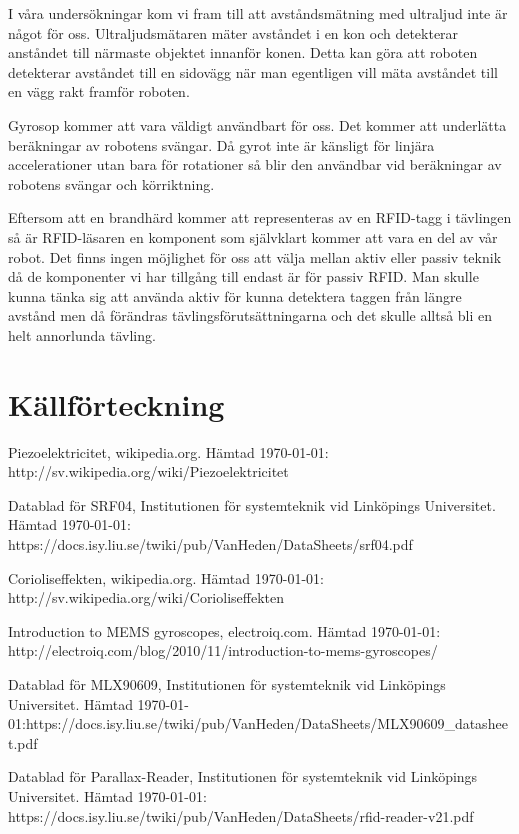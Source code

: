 \documentclass[a4paper,12pt,fleqn]{article}
\begin{document}
I våra undersökningar kom vi fram till att avståndsmätning med ultraljud inte är något för oss. Ultraljudsmätaren mäter avståndet i en kon och detekterar anståndet till närmaste objektet innanför konen. Detta kan göra att roboten detekterar avståndet till en sidovägg när man egentligen vill mäta avståndet till en vägg rakt framför roboten.

Gyrosop kommer att vara väldigt användbart för oss. Det kommer att underlätta beräkningar av robotens svängar. Då gyrot inte är känsligt för linjära accelerationer utan bara för rotationer så blir den användbar vid beräkningar av robotens svängar och körriktning.

Eftersom att en brandhärd kommer att representeras av en RFID-tagg i tävlingen så är RFID-läsaren en komponent som självklart kommer att vara en del av vår robot. Det finns ingen möjlighet för oss att välja mellan aktiv eller passiv teknik då de komponenter vi har tillgång till endast är för passiv RFID. Man skulle kunna tänka sig att använda aktiv för kunna detektera taggen från längre avstånd men då förändras tävlingsförutsättningarna och det skulle alltså bli en helt annorlunda tävling.


\section{Källförteckning}

Piezoelektricitet, wikipedia.org. Hämtad \today:\newline
http://sv.wikipedia.org/wiki/Piezoelektricitet

Datablad för SRF04, Institutionen för systemteknik vid Linköpings Universitet. Hämtad \today:\newline
https://docs.isy.liu.se/twiki/pub/VanHeden/DataSheets/srf04.pdf

Corioliseffekten, wikipedia.org. Hämtad \today:\newline
http://sv.wikipedia.org/wiki/Corioliseffekten

Introduction to MEMS gyroscopes, electroiq.com. Hämtad \today:\newline
http://electroiq.com/blog/2010/11/introduction-to-mems-gyroscopes/

Datablad för MLX90609, Institutionen för systemteknik vid Linköpings Universitet. Hämtad \today:\newline https://docs.isy.liu.se/twiki/pub/VanHeden/DataSheets/MLX90609_datasheet.pdf

Datablad för Parallax-Reader, Institutionen för systemteknik vid Linköpings Universitet. Hämtad \today:\newline
https://docs.isy.liu.se/twiki/pub/VanHeden/DataSheets/rfid-reader-v21.pdf
\end{document}
